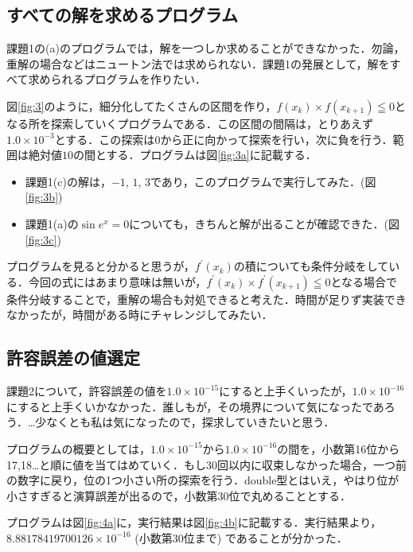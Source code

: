 \documentclass[12pt]{jarticle}
\renewcommand  \[  {\begin{eqnarray}}
\renewcommand  \]  {\end{eqnarray}}
\begin{document}
\subsection{すべての解を求めるプログラム}
課題1の(a)のプログラムでは，解を一つしか求めることができなかった．勿論，重解の場合などはニュートン法では求められない．課題1の発展として，解をすべて求められるプログラムを作りたい．

図\ref{fig:3}のように，細分化してたくさんの区間を作り，$f(x_k) \times f(x_{k+1}) \leqq 0$となる所を探索していくプログラムである．この区間の間隔は，とりあえず$1.0 \times 10^{-3}$とする．この探索は$0$から正に向かって探索を行い，次に負を行う．範囲は絶対値$10$の間とする．プログラムは図\ref{fig:3a}に記載する．

\begin{itemize}
\item 課題1(c)の解は，$-1$, $1$, $3$であり，このプログラムで実行してみた．(図\ref{fig:3b})
\item 課題1(a)の$\sin e^x=0$についても，きちんと解が出ることが確認できた．(図\ref{fig:3c})
\end{itemize}

プログラムを見ると分かると思うが，$f^{\prime}(x_k)$の積についても条件分岐をしている．今回の式にはあまり意味は無いが，$f^{\prime}(x_k) \times f^{\prime}(x_{k+1}) \leqq 0$となる場合で条件分岐することで，重解の場合も対処できると考えた．時間が足りず実装できなかったが，時間がある時にチャレンジしてみたい．

\subsection{許容誤差の値選定}

課題2について，許容誤差の値を$1.0 \times 10^{-15}$にすると上手くいったが，$1.0 \times 10^{-16}$にすると上手くいかなかった．誰しもが，その境界について気になったであろう．\ldots 少なくとも私は気になったので，探求していきたいと思う．

プログラムの概要としては，$1.0 \times 10^{-15}$から$1.0 \times 10^{-16}$の間を，小数第16位から17,18\ldots と順に値を当てはめていく．もし30回以内に収束しなかった場合，一つ前の数字に戻り，位の1つ小さい所の探索を行う．double型とはいえ，やはり位が小さすぎると演算誤差が出るので，小数第30位で丸めることとする．

プログラムは図\ref{fig:4a}に，実行結果は図\ref{fig:4b}に記載する．実行結果より，$8.88178419700126 \times 10^{-16}$ (小数第30位まで) であることが分かった．


\end{document}
